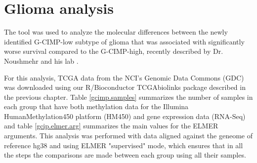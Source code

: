 
\section{Glioma analysis}

The 
tool was used to analyze the molecular differences between the newly
identified G-CIMP-low subtype of glioma that was associated with significantly
worse survival compared to the G-CIMP-high, recently described by Dr. Noushmehr
and his lab \cite{ceccarelli2016molecular}.

For this analysis, TCGA data from the NCI's Genomic Data Commons (GDC) was
downloaded using our R/Bioconductor TCGAbiolinks package described in the previous chapter.
Table \ref{gcimp.samples} summarizes the number of samples in each group that have both 
methylation data for the Illumina HumanMethylation450 platform (HM450) and gene expression data
(RNA-Seq) and table \ref{gcip.elmer.arg} summarizes the main values for the ELMER arguments.
This analysis was performed with data aligned against the geneome of reference hg38 and
using ELMER "supervised" mode, which ensures that in all the steps the
comparisons are made between each group using all their samples.

